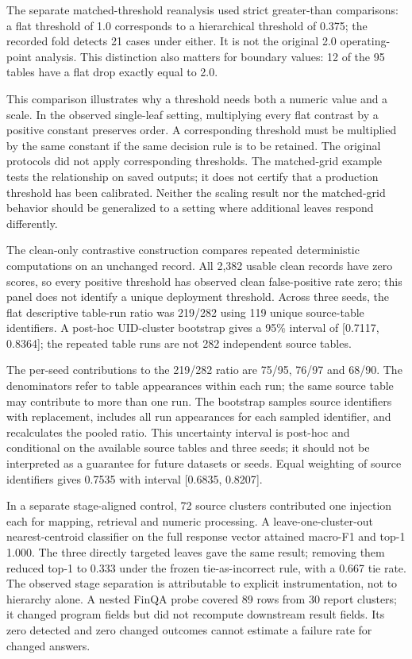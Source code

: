 \documentclass[runningheads]{llncs}
\begin{document}
The separate matched-threshold reanalysis used strict greater-than
comparisons: a flat threshold of 1.0 corresponds to a hierarchical
threshold of 0.375; the recorded fold detects 21 cases under either. It
is not the original 2.0 operating-point analysis. This distinction also
matters for boundary values: 12 of the 95 tables have a flat drop
exactly equal to 2.0.

This comparison illustrates why a threshold needs both a numeric value
and a scale. In the observed single-leaf setting, multiplying every flat
contrast by a positive constant preserves order. A corresponding
threshold must be multiplied by the same constant if the same decision
rule is to be retained. The original protocols did not apply
corresponding thresholds. The matched-grid example tests the
relationship on saved outputs; it does not certify that a production
threshold has been calibrated. Neither the scaling result nor the
matched-grid behavior should be generalized to a setting where
additional leaves respond differently.

The clean-only contrastive construction compares repeated deterministic
computations on an unchanged record. All 2,382 usable clean records have
zero scores, so every positive threshold has observed clean
false-positive rate zero; this panel does not identify a unique
deployment threshold. Across three seeds, the flat descriptive table-run
ratio was 219/282 using 119 unique source-table identifiers. A post-hoc
UID-cluster bootstrap gives a 95\% interval of {[}0.7117, 0.8364{]}; the
repeated table runs are not 282 independent source tables.

The per-seed contributions to the 219/282 ratio are 75/95, 76/97 and
68/90. The denominators refer to table appearances within each run; the
same source table may contribute to more than one run. The bootstrap
samples source identifiers with replacement, includes all run
appearances for each sampled identifier, and recalculates the pooled
ratio. This uncertainty interval is post-hoc and conditional on the
available source tables and three seeds; it should not be interpreted as
a guarantee for future datasets or seeds. Equal weighting of source
identifiers gives 0.7535 with interval {[}0.6835, 0.8207{]}.

In a separate stage-aligned control, 72 source clusters contributed one
injection each for mapping, retrieval and numeric processing. A
leave-one-cluster-out nearest-centroid classifier on the full response
vector attained macro-F1 and top-1 1.000. The three directly targeted
leaves gave the same result; removing them reduced top-1 to 0.333 under
the frozen tie-as-incorrect rule, with a 0.667 tie rate. The observed
stage separation is attributable to explicit instrumentation, not to
hierarchy alone. A nested FinQA probe \cite{r10} covered 89 rows from 30
report clusters; it changed program fields but did not recompute
downstream result fields. Its zero detected and zero changed outcomes
cannot estimate a failure rate for changed answers.
\end{document}
